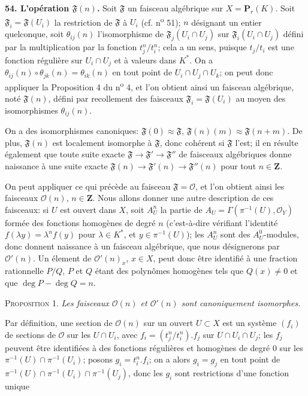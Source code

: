 \textbf{54. L'opération $\mathfrak{F}(n)$.} Soit $\mathfrak{F}$ un faisceau algébrique sur $X = \mathbf{P}_r(K)$. Soit $\mathfrak{F}_i = \mathfrak{F}(U_i)$ la restriction de $\mathfrak{F}$ à $U_i$ (cf. n\textsuperscript{o} 51); $n$ désignant un entier quelconque, soit $\theta_{ij}(n)$ l'isomorphisme de $\mathfrak{F}_j(U_i \cap U_j)$ sur $\mathfrak{F}_i(U_i \cap U_j)$ défini par la multiplication par la fonction $t_j^n/t_i^n$; cela a un sens, puisque $t_j/t_i$ est une fonction régulière sur $U_i \cap U_j$ et à valeurs dans $K^*$. On a $\theta_{ij}(n) \circ \theta_{jk}(n) = \theta_{ik}(n)$ en tout point de $U_i \cap U_j \cap U_k$; on peut donc appliquer la Proposition 4 du n\textsuperscript{o} 4, et l'on obtient ainsi un faisceau algébrique, noté $\mathfrak{F}(n)$, défini par recollement des faisceaux $\mathfrak{F}_i = \mathfrak{F}(U_i)$ au moyen des isomorphismes $\theta_{ij}(n)$.

On a des isomorphismes canoniques: $\mathfrak{F}(0) \approx \mathfrak{F}$, $\mathfrak{F}(n)(m) \approx \mathfrak{F}(n + m)$. De plus, $\mathfrak{F}(n)$ est localement isomorphe à $\mathfrak{F}$, donc cohérent si $\mathfrak{F}$ l'est; il en résulte également que toute suite exacte $\mathfrak{F} \to \mathfrak{F}' \to \mathfrak{F}''$ de faisceaux algébriques donne naissance à une suite exacte $\mathfrak{F}(n) \to \mathfrak{F}'(n) \to \mathfrak{F}''(n)$ pour tout $n \in \mathbf{Z}$.

On peut appliquer ce qui précède au faisceau $\mathfrak{F} = \mathcal{O}$, et l'on obtient ainsi les faisceaux $\mathcal{O}(n)$, $n \in \mathbf{Z}$. Nous allons donner une autre description de ces faisceaux: si $U$ est ouvert dans $X$, soit $A_U^n$ la partie de $A_U = \Gamma(\pi^{-1}(U), \mathcal{O}_Y)$ formée des fonctions homogènes de degré $n$ (c'est-à-dire vérifiant l'identité $f(\lambda y) = \lambda^n f(y)$ pour $\lambda \in K^*$, et $y \in \pi^{-1}(U)$); les $A_U^n$ sont des $A_U^0$-modules, donc donnent naissance à un faisceau algébrique, que nous désignerons par $\mathcal{O}'(n)$. Un élement de $\mathcal{O}'(n)_x$, $x \in X$, peut donc être identifié à une fraction rationnelle $P/Q$, $P$ et $Q$ étant des polynômes homogènes tels que $Q(x) \neq 0$ et que $\deg P - \deg Q = n$.

\textsc{Proposition} 1. \textit{Les faisceaux $\mathcal{O}(n)$ et $\mathcal{O}'(n)$ sont canoniquement isomorphes.}

Par définition, une section de $\mathcal{O}(n)$ sur un ouvert $U \subset X$ est un système $(f_i)$ de sections de $\mathcal{O}$ sur les $U \cap U_i$, avec $f_i = (t_j^n/t_i^n).f_j$ sur $U \cap U_i \cap U_j$; les $f_j$ peuvent être identifiées à des fonctions régulières et homogènes de degré 0 sur les $\pi^{-1}(U) \cap \pi^{-1}(U_i)$; posons $g_i = t_i^n.f_i$; on a alors $g_i = g_j$ en tout point de $\pi^{-1}(U) \cap \pi^{-1}(U_i) \cap \pi^{-1}(U_j)$, donc les $g_i$ sont restrictions d'une fonction unique


